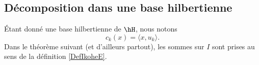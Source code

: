 \subsection{Décomposition dans une base hilbertienne}

Étant donné une base hilbertienne de \( \hH\), nous notons
\begin{equation}
    c_k(x)=\langle x, u_k\rangle .
\end{equation}
Dans le théorème suivant (et d'ailleurs partout), les sommes sur \( I\) sont prises au sens de la définition \ref{DefIkoheE}.



